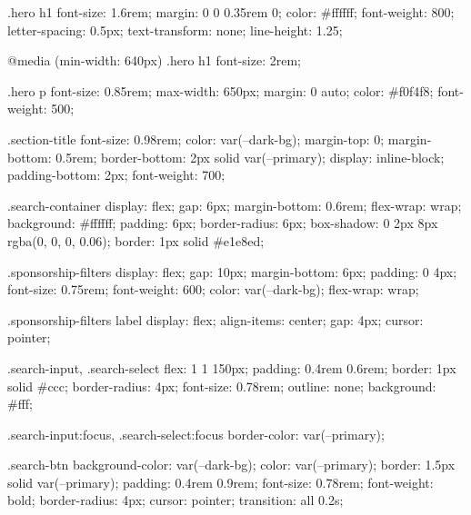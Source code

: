         .hero h1 {
            font-size: 1.6rem;
            margin: 0 0 0.35rem 0;
            color: #ffffff;
            font-weight: 800;
            letter-spacing: 0.5px;
            text-transform: none;
            line-height: 1.25;
        }

        @media (min-width: 640px) {
            .hero h1 {
                font-size: 2rem;
            }
        }

        .hero p {
            font-size: 0.85rem;
            max-width: 650px;
            margin: 0 auto;
            color: #f0f4f8;
            font-weight: 500;
        }

        .section-title {
            font-size: 0.98rem;
            color: var(--dark-bg);
            margin-top: 0;
            margin-bottom: 0.5rem;
            border-bottom: 2px solid var(--primary);
            display: inline-block;
            padding-bottom: 2px;
            font-weight: 700;
        }

        .search-container {
            display: flex;
            gap: 6px;
            margin-bottom: 0.6rem;
            flex-wrap: wrap;
            background: #ffffff;
            padding: 6px;
            border-radius: 6px;
            box-shadow: 0 2px 8px rgba(0, 0, 0, 0.06);
            border: 1px solid #e1e8ed;
        }

        .sponsorship-filters {
            display: flex;
            gap: 10px;
            margin-bottom: 6px;
            padding: 0 4px;
            font-size: 0.75rem;
            font-weight: 600;
            color: var(--dark-bg);
            flex-wrap: wrap;
        }

        .sponsorship-filters label {
            display: flex;
            align-items: center;
            gap: 4px;
            cursor: pointer;
        }

        .search-input,
        .search-select {
            flex: 1 1 150px;
            padding: 0.4rem 0.6rem;
            border: 1px solid #ccc;
            border-radius: 4px;
            font-size: 0.78rem;
            outline: none;
            background: #fff;
        }

        .search-input:focus,
        .search-select:focus {
            border-color: var(--primary);
        }

        .search-btn {
            background-color: var(--dark-bg);
            color: var(--primary);
            border: 1.5px solid var(--primary);
            padding: 0.4rem 0.9rem;
            font-size: 0.78rem;
            font-weight: bold;
            border-radius: 4px;
            cursor: pointer;
            transition: all 0.2s;
        }

